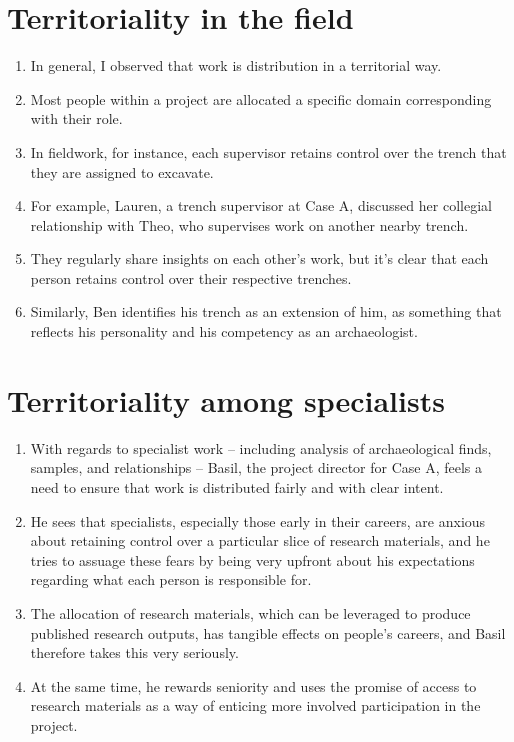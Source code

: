 \documentclass[12pt]{article}
\begin{document}
\section{Territoriality in the field}
\begin{enumerate}
  \item In general, I observed that work is distribution in a territorial way.
  \item Most people within a project are allocated a specific domain corresponding with their role.
  \item In fieldwork, for instance, each supervisor retains control over the trench that they are assigned to excavate.
  \item For example, Lauren, a trench supervisor at Case A, discussed her collegial relationship with Theo, who supervises work on another nearby trench.
  \item They regularly share insights on each other's work, but it's clear that each person retains control over their respective trenches.
  \item Similarly, Ben identifies his trench as an extension of him, as something that reflects his personality and his competency as an archaeologist.
\end{enumerate}

\section{Territoriality among specialists}
\begin{enumerate}
  \item With regards to specialist work -- including analysis of archaeological finds, samples, and relationships -- Basil, the project director for Case A, feels a need to ensure that work is distributed fairly and with clear intent.
  \item He sees that specialists, especially those early in their careers, are anxious about retaining control over a particular slice of research materials, and he tries to assuage these fears by being very upfront about his expectations regarding what each person is responsible for.
  \item The allocation of research materials, which can be leveraged to produce published research outputs, has tangible effects on people's careers, and Basil therefore takes this very seriously.
  \item At the same time, he rewards seniority and uses the promise of access to research materials as a way of enticing more involved participation in the project.
\end{enumerate}
  
\end{document}
